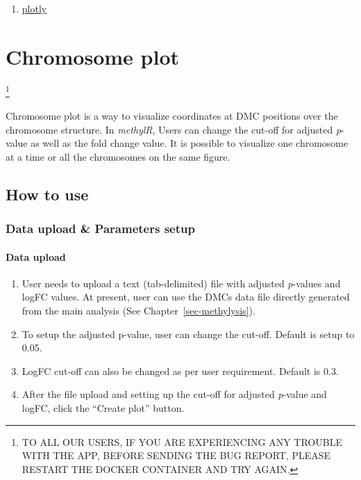 \documentclass[
  a4paper,
  DIV=11,
  numbers=noendperiod,
  oneside,
  open=any]{scrreport}
\providecommand{\tightlist}{%
  \setlength{\itemsep}{0pt}\setlength{\parskip}{0pt}}\usepackage{longtable,booktabs,array}
\begin{document}
\begin{enumerate}
\def\labelenumi{\arabic{enumi}.}
\tightlist
\item
  \href{https://cran.r-project.org/web/packages/plotly/plotly.pdf}{plotly}
\end{enumerate}

\chapter{Chromosome plot}\label{sec-chromosome}

\footnote{TO ALL OUR USERS, IF YOU ARE EXPERIENCING ANY TROUBLE WITH THE
  APP, BEFORE SENDING THE BUG REPORT, PLEASE RESTART THE DOCKER
  CONTAINER AND TRY AGAIN.}

Chromosome plot is a way to visualize coordinates at DMC positions over
the chromosome structure. In \emph{methylR}, Users can change the
cut-off for adjusted \emph{p}-value as well as the fold change value. It
is possible to visualize one chromosome at a time or all the chromosomes
on the same figure.

\section{How to use}\label{how-to-use-6}

\subsection{Data upload \& Parameters
setup}\label{data-upload-parameters-setup-3}

\subsubsection{Data upload}\label{data-upload-3}

\begin{enumerate}
\def\labelenumi{\arabic{enumi}.}
\tightlist
\item
  User needs to upload a text (tab-delimited) file with adjusted
  \emph{p}-values and logFC values. At present, user can use the DMCs
  data file directly generated from the main analysis (See
  Chapter~\ref{sec-methylysis}).
\item
  To setup the adjusted p-value, user can change the cut-off. Default is
  setup to 0.05.
\item
  LogFC cut-off can also be changed as per user requirement. Default is
  0.3.
\item
  After the file upload and setting up the cut-off for adjusted
  \emph{p}-value and logFC, click the ``Create plot'' button.
\end{enumerate}
\end{document}
